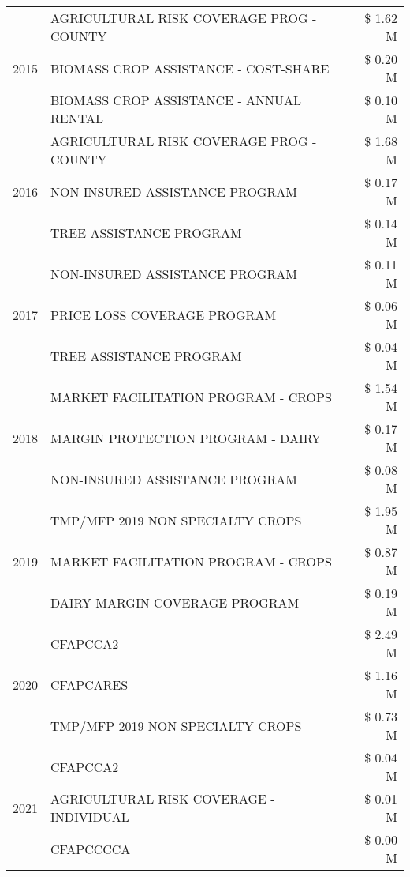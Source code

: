 \begin{tabular}{llr}
\cline{1-3}
\multirow[t]{3}{*}{2015} & AGRICULTURAL RISK COVERAGE PROG - COUNTY & \$ 1.62 M \\
 & BIOMASS CROP ASSISTANCE - COST-SHARE & \$ 0.20 M \\
 & BIOMASS CROP ASSISTANCE - ANNUAL RENTAL & \$ 0.10 M \\
\cline{1-3}
\multirow[t]{3}{*}{2016} & AGRICULTURAL RISK COVERAGE PROG - COUNTY & \$ 1.68 M \\
 & NON-INSURED ASSISTANCE PROGRAM & \$ 0.17 M \\
 & TREE ASSISTANCE PROGRAM & \$ 0.14 M \\
\cline{1-3}
\multirow[t]{3}{*}{2017} & NON-INSURED ASSISTANCE PROGRAM & \$ 0.11 M \\
 & PRICE LOSS COVERAGE PROGRAM & \$ 0.06 M \\
 & TREE ASSISTANCE PROGRAM & \$ 0.04 M \\
\cline{1-3}
\multirow[t]{3}{*}{2018} & MARKET FACILITATION PROGRAM - CROPS & \$ 1.54 M \\
 & MARGIN PROTECTION PROGRAM - DAIRY & \$ 0.17 M \\
 & NON-INSURED ASSISTANCE PROGRAM & \$ 0.08 M \\
\cline{1-3}
\multirow[t]{3}{*}{2019} & TMP/MFP 2019 NON SPECIALTY CROPS & \$ 1.95 M \\
 & MARKET FACILITATION PROGRAM - CROPS & \$ 0.87 M \\
 & DAIRY MARGIN COVERAGE PROGRAM & \$ 0.19 M \\
\cline{1-3}
\multirow[t]{3}{*}{2020} & CFAPCCA2 & \$ 2.49 M \\
 & CFAPCARES & \$ 1.16 M \\
 & TMP/MFP 2019 NON SPECIALTY CROPS & \$ 0.73 M \\
\cline{1-3}
\multirow[t]{3}{*}{2021} & CFAPCCA2 & \$ 0.04 M \\
 & AGRICULTURAL RISK COVERAGE - INDIVIDUAL & \$ 0.01 M \\
 & CFAPCCCCA & \$ 0.00 M \\
\cline{1-3}
\bottomrule
\end{tabular}
